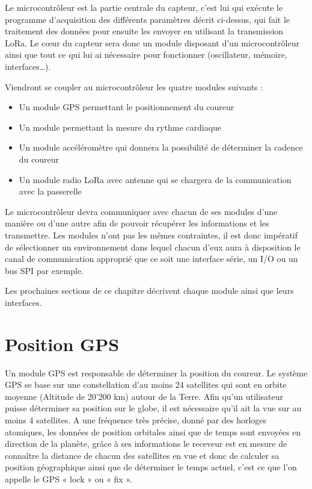 Le microcontrôleur est la partie centrale du capteur, c’est lui qui exécute le programme d’acquisition des différents paramètres décrit ci-dessus, qui fait le traitement des données pour ensuite les envoyer en utilisant la transmission LoRa. Le cœur du capteur sera donc un module disposant d’un microcontrôleur ainsi que tout ce qui lui ai nécessaire pour fonctionner (oscillateur, mémoire, interfaces…).

Viendront se coupler au microcontrôleur les quatre modules suivants :
\begin{itemize}
\item Un module GPS permettant le positionnement du coureur
\item Un module permettant la mesure du rythme cardiaque
\item Un module accéléromètre qui donnera la possibilité de déterminer la cadence du coureur
\item Un module radio LoRa avec antenne qui se chargera de la communication avec la passerelle\\
\end{itemize}

Le microcontrôleur devra communiquer avec chacun de ses modules d’une manière ou d’une autre afin de pouvoir récupérer les informations et les transmettre. Les modules n’ont pas les mêmes contraintes, il est donc impératif de sélectionner un environnement dans lequel chacun d’eux aura à disposition le canal de communication approprié que ce soit une interface série, un I/O ou un bus SPI par exemple.

Les prochaines sections de ce chapitre décrivent chaque module ainsi que leurs interfaces.

\section{Position GPS}

Un module GPS est responsable de déterminer la position du coureur. Le système GPS se base sur une constellation d’au moins 24 satellites qui sont en orbite moyenne (Altitude de 20'200 km) autour de la Terre. Afin qu’un utilisateur puisse déterminer sa position sur le globe, il est nécessaire qu’il ait la vue sur au moins 4 satellites. A une fréquence très précise, donné par des horloges atomiques, les données de position orbitales ainsi que de temps sont envoyées en direction de la planète, grâce à ses informations le receveur est en mesure de connaître la distance de chacun des satellites en vue et donc de calculer sa position géographique ainsi que de déterminer le temps actuel, c’est ce que l’on appelle le GPS « lock » ou « fix ». \cite{gps_overview}

